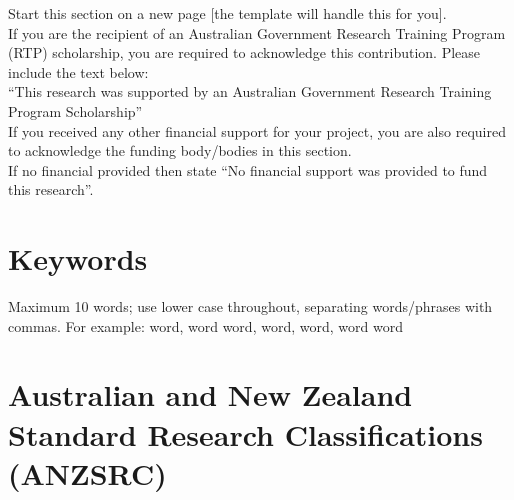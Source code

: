 \begin{instructional}
    Start this section on a new page [the template will handle this for you].\\
    
    \noindent
    If you are the recipient of an Australian Government Research Training Program (RTP) scholarship, you are required to acknowledge this contribution.  Please include the text below:\\
    
    \noindent
    ``This research was supported by an Australian Government Research Training Program Scholarship''\\
    
    \noindent
    If you received any other financial support for your project, you are also required to acknowledge the funding body/bodies in this section.\\
    
    \noindent
    If no financial provided then state ``No financial support was provided to fund this research''.
\end{instructional}





\section*{Keywords}

\begin{instructional}
	Maximum 10 words; use lower case throughout, separating words/phrases with commas. For example: word, word word, word, word, word word
\end{instructional}




\section*{Australian and New Zealand Standard Research Classifications (ANZSRC)}

